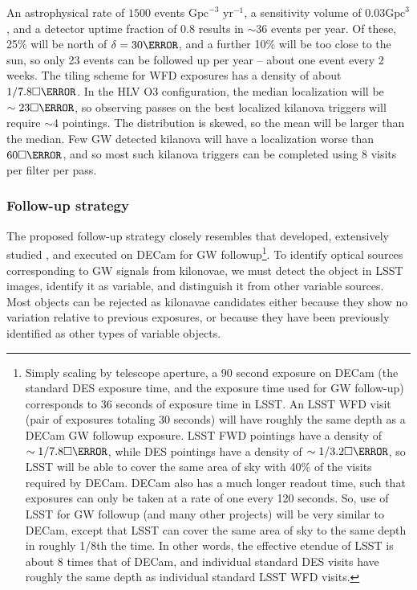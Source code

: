 An astrophysical rate of $1500$ events $\mbox{Gpc}^{-3}$ $\mbox{yr}^{-1}$, a sensitivity volume of $0.03 \mbox{Gpc}^3$ , and a detector uptime fraction of $0.8$ results in $\sim 36$ events per year. Of these, 25\% will be north of $\delta=30\degree$, and a further 10\% will be too close to the sun, so only 23 events can be followed up per year -- about one event every 2 weeks. The tiling scheme for WFD exposures has a density of about $1/7.8\square\degree$. In the HLV O3 configuration, the median localization will be $\sim 23 \square\degree$, so observing passes on the best localized kilanova triggers will require $\sim 4$ pointings. The distribution is skewed, so the mean will be larger than the median. Few GW detected kilanova will have a localization worse than $60 \square \degree$, and so most such kilanova triggers can be completed using 8 visits per filter per pass.


\subsubsection{Follow-up strategy}

The proposed follow-up strategy closely resembles that developed, extensively studied , and executed  on DECam for GW followup\footnote{Simply scaling by telescope aperture, a 90 second exposure on DECam (the standard DES exposure time, and the exposure time used for GW follow-up) corresponds to 36 seconds of exposure time in LSST. An LSST WFD visit (pair of exposures totaling 30 seconds) will have roughly the same depth as a DECam GW followup exposure. LSST FWD pointings have a density of $\sim 1/7.8\square\degree$, while DES pointings have a density of $\sim 1/3.2\square\degree$, so LSST will be able to cover the same area of sky with 40\% of the visits required by DECam.  DECam also has a much longer readout time, such that exposures can only be taken at a rate of one every 120 seconds. So, use of LSST for GW followup (and many other projects) will be very similar to DECam, except that LSST can cover the same area of sky to the same depth in roughly 1/8th the time. In other words, the effective etendue of LSST is about 8 times that of DECam, and individual standard DES visits have roughly the same depth as individual standard LSST WFD visits.}. To identify optical sources corresponding to GW signals from kilonovae, we must detect the object in LSST images, identify it as variable, and distinguish it from other variable sources. Most objects can be rejected as kilonavae candidates either because they show no variation relative to previous exposures, or because they have been previously identified as other types of variable objects.

